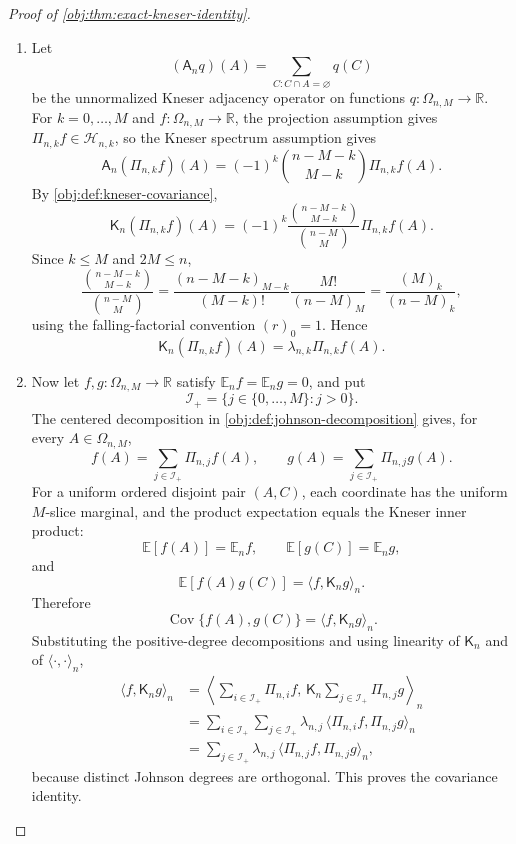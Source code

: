 \documentclass[11pt]{article}
\begin{document}
\begin{proof}[Proof of \cref{obj:thm:exact-kneser-identity}]
\begin{enumerate}
\item Let
\[
(\mathsf A_n q)(A)=\sum_{C:C\cap A=\varnothing}q(C)
\]
be the unnormalized Kneser adjacency operator on functions \(q:\Omega_{n,M}\to\mathbb R\).  For \(k=0,\ldots,M\) and \(f:\Omega_{n,M}\to\mathbb R\), the projection assumption gives \(\Pi_{n,k}f\in\mathcal H_{n,k}\), so the Kneser spectrum assumption gives
\[
\mathsf A_n(\Pi_{n,k}f)(A)
=
(-1)^k\binom{n-M-k}{M-k}\Pi_{n,k}f(A).
\]
By \cref{obj:def:kneser-covariance},
\[
\mathsf K_n(\Pi_{n,k}f)(A)
=
(-1)^k
\frac{\binom{n-M-k}{M-k}}{\binom{n-M}{M}}
\Pi_{n,k}f(A).
\]
Since \(k\le M\) and \(2M\le n\),
\[
\frac{\binom{n-M-k}{M-k}}{\binom{n-M}{M}}
=
\frac{(n-M-k)_{M-k}}{(M-k)!}\frac{M!}{(n-M)_M}
=
\frac{(M)_k}{(n-M)_k},
\]
using the falling-factorial convention \((r)_0=1\).  Hence
\[
\mathsf K_n(\Pi_{n,k}f)(A)
=
\lambda_{n,k}\Pi_{n,k}f(A).
\]

\item Now let \(f,g:\Omega_{n,M}\to\mathbb R\) satisfy \(\mathbb E_n f=\mathbb E_n g=0\), and put
\[
\mathcal I_+=\{j\in\{0,\ldots,M\}:j>0\}.
\]
The centered decomposition in \cref{obj:def:johnson-decomposition} gives, for every \(A\in\Omega_{n,M}\),
\[
f(A)=\sum_{j\in\mathcal I_+}\Pi_{n,j}f(A),
\qquad
g(A)=\sum_{j\in\mathcal I_+}\Pi_{n,j}g(A).
\]
For a uniform ordered disjoint pair \((A,C)\), each coordinate has the uniform \(M\)-slice marginal, and the product expectation equals the Kneser inner product:
\[
\mathbb E[f(A)]=\mathbb E_n f,\qquad
\mathbb E[g(C)]=\mathbb E_n g,
\]
and
\[
\mathbb E[f(A)g(C)]
=
\langle f,\mathsf K_n g\rangle_n .
\]
Therefore
\[
\operatorname{Cov}\{f(A),g(C)\}
=
\langle f,\mathsf K_n g\rangle_n.
\]
Substituting the positive-degree decompositions and using linearity of \(\mathsf K_n\) and of \(\langle\cdot,\cdot\rangle_n\),
\[
\begin{aligned}
\langle f,\mathsf K_n g\rangle_n
&=
\left\langle
\sum_{i\in\mathcal I_+}\Pi_{n,i}f,\,
\mathsf K_n\sum_{j\in\mathcal I_+}\Pi_{n,j}g
\right\rangle_n  \\
&=
\sum_{i\in\mathcal I_+}\sum_{j\in\mathcal I_+}
\lambda_{n,j}\,
\langle \Pi_{n,i}f,\Pi_{n,j}g\rangle_n  \\
&=
\sum_{j\in\mathcal I_+}
\lambda_{n,j}\,
\langle \Pi_{n,j}f,\Pi_{n,j}g\rangle_n ,
\end{aligned}
\]
because distinct Johnson degrees are orthogonal.  This proves the covariance identity.


\end{enumerate}
\end{proof}
\end{document}
